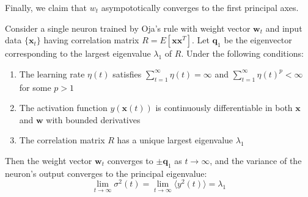   Finally, we claim that $w_t$ asympototically converges to the first principal axes. 

  \begin{theorem}
    Consider a single neuron trained by Oja's rule with weight vector $\mathbf{w}_t$ and input data $\{\mathbf{x}_t\}$ having correlation matrix $R = E[\mathbf{x}\mathbf{x}^T]$. Let $\mathbf{q}_1$ be the eigenvector corresponding to the largest eigenvalue $\lambda_1$ of $R$. Under the following conditions:
    \begin{enumerate}
      \item The learning rate $\eta(t)$ satisfies $\sum_{t=1}^{\infty} \eta(t) = \infty$ and $\sum_{t=1}^{\infty} \eta(t)^p < \infty$ for some $p > 1$
      \item The activation function $y(\mathbf{x}(t))$ is continuously differentiable in both $\mathbf{x}$ and $\mathbf{w}$ with bounded derivatives
      \item The correlation matrix $R$ has a unique largest eigenvalue $\lambda_1$
    \end{enumerate}
    Then the weight vector $\mathbf{w}_t$ converges to $\pm\mathbf{q}_1$ as $t \to \infty$, and the variance of the neuron's output converges to the principal eigenvalue:
    \begin{equation}
      \lim_{t \to \infty} \sigma^2(t) = \lim_{t \to \infty} \langle y^2(t) \rangle = \lambda_1
    \end{equation}
  \end{theorem}
